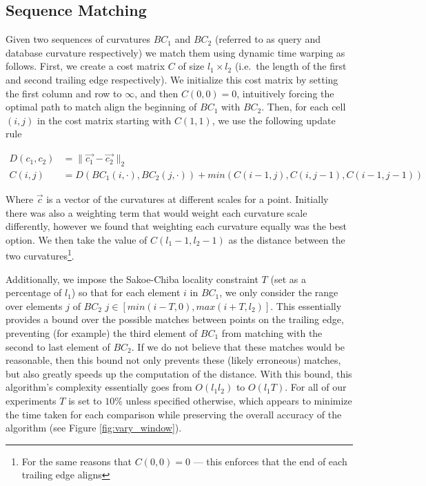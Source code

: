 \subsection{Sequence Matching}

Given two sequences of curvatures $BC_1$ and $BC_2$ (referred to as query and database curvature respectively) we match them using dynamic time warping as follows.
First, we create a cost matrix $C$ of size $l_1 \times l_2$ (i.e.\ the length of the first and second trailing edge respectively). 
We initialize this cost matrix by setting the first column and row to $\infty$, and then $C(0,0) = 0$, intuitively forcing the optimal path to match align the beginning of $BC_1$ with $BC_2$.
Then, for each cell $(i,j)$ in the cost matrix starting with $C(1,1)$, we use the following update rule

\begin{align} 
\label{eqn:dtw_dist}
D(c_1, c_2) &= \lVert \vec{c_1} - \vec{c_2} \rVert_2\\
\label{eqn:dtw_update}
C(i,j) &= D(BC_1(i,\cdot),BC_2(j,\cdot)) + min(C(i-1,j), C(i,j-1), C(i-1, j-1))
\end{align}

Where $\vec{c}$ is a vector of the curvatures at different scales for a point.
Initially there was also a weighting term that would weight each curvature scale differently, however we found that weighting each curvature equally was the best option.
We then take the value of $C(l_1-1, l_2-1)$ as the distance between the two curvatures\footnote{For the same reasons that $C(0,0) = 0$ --- this enforces that the end of each trailing edge aligns}.

Additionally, we impose the Sakoe-Chiba \cite{sakoe1978dynamic} locality constraint $T$ (set as a percentage of $l_1$) so that for each element $i$ in $BC_1$, we only consider the range over elements $j$ of $BC_2$ $j \in [min(i - T, 0), max(i + T, l_2)]$.
This essentially provides a bound over the possible matches between points on the trailing edge, preventing (for example) the third element of $BC_1$ from matching with the second to last element of $BC_2$.
If we do not believe that these matches would be reasonable, then this bound not only prevents these (likely erroneous) matches, but also greatly speeds up the computation of the distance.
With this bound, this algorithm's complexity essentially goes from $O(l_1l_2)$ to $O(l_1T)$.
For all of our experiments $T$ is set to $10\%$ unless specified otherwise, which appears to minimize the time taken for each comparison while preserving the overall accuracy of the algorithm (see Figure \ref{fig:vary_window}).

